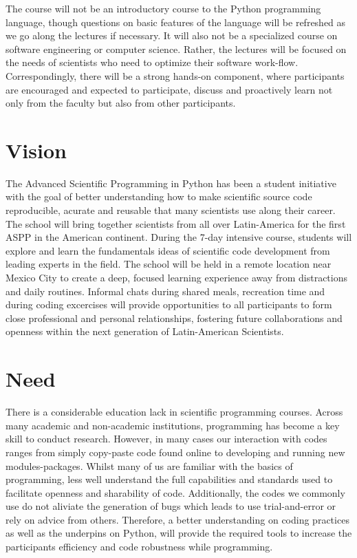 \documentclass{article}[11pt]
\begin{document}
The course will not be an introductory course to the Python programming language, though questions on basic features of the language will be refreshed as we go along the lectures if necessary. 
It will also not be a specialized course on software engineering or computer science. 
Rather, the lectures will be focused on the needs of scientists who need to optimize their software work-flow. 
Correspondingly, there will be a strong hands-on component, where participants are encouraged and expected to participate, discuss and proactively learn not only from the faculty but also from other participants. 


\section*{Vision}
The Advanced Scientific Programming in Python has been a student initiative with the goal of better understanding how to make scientific source code reproducible, acurate and reusable that many scientists use along their career. 
The school will bring together scientists from all over Latin-America for the
first ASPP in the American continent. 
During the 7-day intensive course, students will explore and learn the fundamentals ideas of scientific code development from leading experts in the field. 
The school will be held in a remote location near Mexico City to create a deep, focused learning experience away from distractions and daily routines. 
Informal chats during shared meals, recreation time and during coding excercises will provide opportunities to all participants to form close professional and personal relationships, fostering future collaborations and openness within the next generation of Latin-American Scientists.

\section*{Need}
There is a considerable education lack in scientific programming courses. 
Across many academic and non-academic institutions, programming has become a key skill to conduct research. 
However, in many cases our interaction with codes ranges from simply copy-paste code found online to developing and running new modules-packages. 
Whilst many of us are familiar with the basics of programming, less well understand the full capabilities and standards used to facilitate openness and sharability of code. 
Additionally, the codes we commonly use do not aliviate the generation of bugs which leads to use trial-and-error or rely on advice from others. 
Therefore, a better understanding on coding practices as well as the underpins on Python, will provide the required tools to increase the participants efficiency and code robustness while programming.
\end{document}
